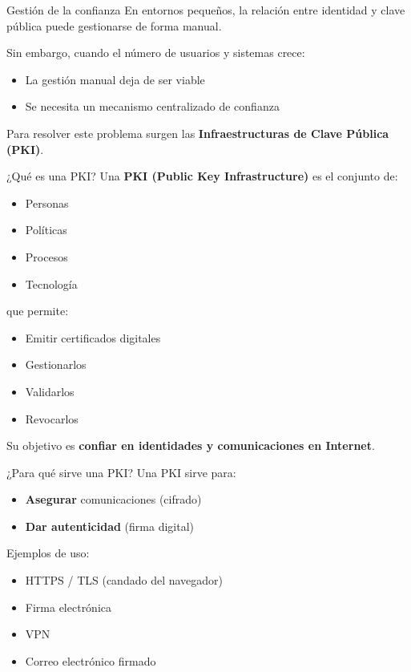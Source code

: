 \documentclass{beamer}
\begin{document}
\begin{frame}{Gestión de la confianza}
En entornos pequeños, la relación entre identidad y clave pública puede gestionarse de forma manual.

\vspace{0.3cm}
Sin embargo, cuando el número de usuarios y sistemas crece:
\begin{itemize}
    \item La gestión manual deja de ser viable
    \item Se necesita un mecanismo centralizado de confianza
\end{itemize}

\vspace{0.3cm}
Para resolver este problema surgen las \textbf{Infraestructuras de Clave Pública (PKI)}.
\end{frame}

\begin{frame}{¿Qué es una PKI?}
Una \textbf{PKI (Public Key Infrastructure)} es el conjunto de:
\begin{itemize}
    \item Personas
    \item Políticas
    \item Procesos
    \item Tecnología
\end{itemize}

\vspace{0.2cm}
que permite:
\begin{itemize}
    \item Emitir certificados digitales
    \item Gestionarlos
    \item Validarlos
    \item Revocarlos
\end{itemize}

\vspace{0.2cm}
Su objetivo es \textbf{confiar en identidades y comunicaciones en Internet}.
\end{frame}

\begin{frame}{¿Para qué sirve una PKI?}
Una PKI sirve para:
\begin{itemize}
    \item \textbf{Asegurar} comunicaciones (cifrado)
    \item \textbf{Dar autenticidad} (firma digital)
\end{itemize}

\vspace{0.3cm}
Ejemplos de uso:
\begin{itemize}
    \item HTTPS / TLS (candado del navegador)
    \item Firma electrónica
    \item VPN
    \item Correo electrónico firmado
\end{itemize}
\end{frame}
\end{document}
